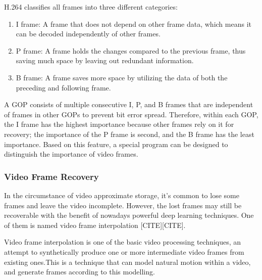 \documentclass[sigconf]{acmart}
\begin{document}
H.264 classifies all frames into three different categories:
\begin{enumerate}
    \item I frame: A frame that does not depend on other frame data, which means it can be decoded independently of other frames.
    \item P frame: A frame holds the changes compared to the previous frame, thus saving much space by leaving out redundant information.
    \item B frame: A frame saves more space by utilizing the data of both the preceding and following frame.
\end{enumerate}
A GOP consists of multiple consecutive I, P, and B frames that are independent of frames in other GOPs to prevent bit error spread.
Therefore, within each GOP, the I frame has the highest importance because other frames rely on it for recovery; the importance of the P frame is second, and the B frame has the least importance. Based on this feature, a special program can be designed to distinguish the importance of video frames.

\subsubsection{Video Frame Recovery}
In the circumstance of video approximate storage, it's common to lose some frames and leave the video incomplete. However, the lost frames may still be recoverable with the benefit of nowadays powerful deep learning techniques. One of them is named video frame interpolation [CITE][CITE].

Video frame interpolation is one of the basic video processing techniques, an attempt to synthetically produce one or more intermediate video frames from existing ones.This is a technique that can model natural motion within a video, and generate frames according to this modelling.
\end{document}

